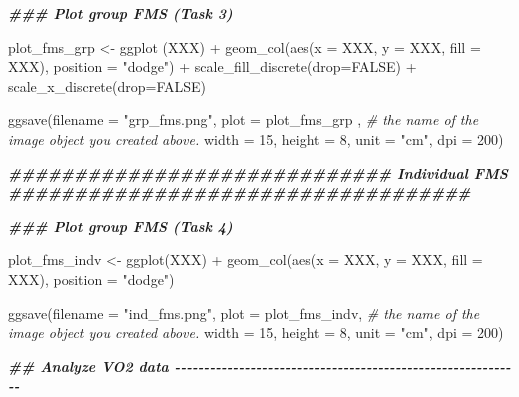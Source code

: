 \documentclass[
]{book}
\newenvironment{Shaded}{\begin{snugshade}}{\end{snugshade}}
\newcommand{\AttributeTok}[1]{\textcolor[rgb]{0.77,0.63,0.00}{#1}}
\newcommand{\CommentTok}[1]{\textcolor[rgb]{0.56,0.35,0.01}{\textit{#1}}}
\newcommand{\ConstantTok}[1]{\textcolor[rgb]{0.00,0.00,0.00}{#1}}
\newcommand{\DecValTok}[1]{\textcolor[rgb]{0.00,0.00,0.81}{#1}}
\newcommand{\DocumentationTok}[1]{\textcolor[rgb]{0.56,0.35,0.01}{\textbf{\textit{#1}}}}
\newcommand{\FunctionTok}[1]{\textcolor[rgb]{0.00,0.00,0.00}{#1}}
\newcommand{\NormalTok}[1]{#1}
\newcommand{\OtherTok}[1]{\textcolor[rgb]{0.56,0.35,0.01}{#1}}
\newcommand{\SpecialCharTok}[1]{\textcolor[rgb]{0.00,0.00,0.00}{#1}}
\newcommand{\StringTok}[1]{\textcolor[rgb]{0.31,0.60,0.02}{#1}}
\begin{document}
\begin{Shaded}
\begin{Highlighting}[]
\DocumentationTok{\#\#\# Plot group FMS (Task 3)}

\NormalTok{plot\_fms\_grp }\OtherTok{\textless{}{-}} \FunctionTok{ggplot}\NormalTok{ (XXX) }\SpecialCharTok{+}
  \FunctionTok{geom\_col}\NormalTok{(}\FunctionTok{aes}\NormalTok{(}\AttributeTok{x =}\NormalTok{ XXX, }\AttributeTok{y =}\NormalTok{ XXX, }\AttributeTok{fill =}\NormalTok{ XXX), }\AttributeTok{position =} \StringTok{"dodge"}\NormalTok{) }\SpecialCharTok{+}
  \FunctionTok{scale\_fill\_discrete}\NormalTok{(}\AttributeTok{drop=}\ConstantTok{FALSE}\NormalTok{) }\SpecialCharTok{+}
  \FunctionTok{scale\_x\_discrete}\NormalTok{(}\AttributeTok{drop=}\ConstantTok{FALSE}\NormalTok{)}

\FunctionTok{ggsave}\NormalTok{(}\AttributeTok{filename =} \StringTok{"grp\_fms.png"}\NormalTok{, }
       \AttributeTok{plot =}\NormalTok{ plot\_fms\_grp , }\CommentTok{\# the name of the image object you created above.}
       \AttributeTok{width =} \DecValTok{15}\NormalTok{, }
       \AttributeTok{height =} \DecValTok{8}\NormalTok{, }
       \AttributeTok{unit =} \StringTok{"cm"}\NormalTok{, }
       \AttributeTok{dpi =} \DecValTok{200}\NormalTok{)}

\DocumentationTok{\#\#\#\#\#\#\#\#\#\#\#\#\#\#\#\#\#\#\#\#\#\#\#\#\#\#\#\#\# Individual FMS \#\#\#\#\#\#\#\#\#\#\#\#\#\#\#\#\#\#\#\#\#\#\#\#\#\#\#\#\#\#\#\#\#\#\#}

\DocumentationTok{\#\#\# Plot group FMS (Task 4)}

\NormalTok{plot\_fms\_indv }\OtherTok{\textless{}{-}} \FunctionTok{ggplot}\NormalTok{(XXX) }\SpecialCharTok{+}
  \FunctionTok{geom\_col}\NormalTok{(}\FunctionTok{aes}\NormalTok{(}\AttributeTok{x =}\NormalTok{ XXX, }\AttributeTok{y =}\NormalTok{ XXX, }\AttributeTok{fill =}\NormalTok{ XXX), }\AttributeTok{position =} \StringTok{"dodge"}\NormalTok{)}

\FunctionTok{ggsave}\NormalTok{(}\AttributeTok{filename =} \StringTok{"ind\_fms.png"}\NormalTok{, }
       \AttributeTok{plot =}\NormalTok{ plot\_fms\_indv, }\CommentTok{\# the name of the image object you created above.}
       \AttributeTok{width =} \DecValTok{15}\NormalTok{, }
       \AttributeTok{height =} \DecValTok{8}\NormalTok{, }
       \AttributeTok{unit =} \StringTok{"cm"}\NormalTok{, }
       \AttributeTok{dpi =} \DecValTok{200}\NormalTok{)}


\DocumentationTok{\#\# Analyze VO2 data {-}{-}{-}{-}{-}{-}{-}{-}{-}{-}{-}{-}{-}{-}{-}{-}{-}{-}{-}{-}{-}{-}{-}{-}{-}{-}{-}{-}{-}{-}{-}{-}{-}{-}{-}{-}{-}{-}{-}{-}{-}{-}{-}{-}{-}{-}{-}{-}{-}{-}{-}{-}{-}{-}{-}{-}{-}{-}{-}{-}}


\end{Highlighting}
\end{Shaded}
\end{document}
